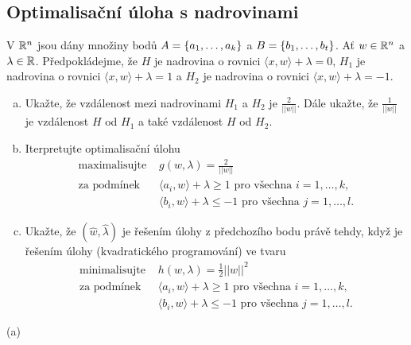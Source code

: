 \subsection{Optimalisační úloha s nadrovinami}
V $\mathbb{R}^n$ jsou dány množiny bodů $A = \left\lbrace a_1, \dots, a_k \right\rbrace$ a $B = \left\lbrace b_1, \dots, b_t \right\rbrace$. Ať $w \in \mathbb{R}^n$ a $\lambda \in \mathbb{R}$.
Předpokládejme, že $H$ je nadrovina o rovnici $\langle x,w \rangle + \lambda = 0$, $H_1$ je nadrovina o rovnici
$\langle x, w \rangle + \lambda = 1$ a $H_2$ je nadrovina o rovnici $\langle x, w \rangle + \lambda = -1$.
\begin{enumerate}[(a)]
    \item Ukažte, že vzdálenost mezi nadrovinami $H_1$ a $H_2$ je $\frac{2}{||w||}$. Dále ukažte, že $\frac{1}{||w||}$
    je vzdálenost $H$ od $H_1$ a také vzdálenost $H$ od $H_2$.
    \item Iterpretujte optimalisační úlohu
    \begin{align*}
        \text{maximalisujte } & g(w, \lambda) = \frac{2}{||w||} \\
        \text{za podmínek }   & \langle a_i, w \rangle + \lambda \geq 1 \text{ pro všechna } i=1, \dots, k, \\
                              & \langle b_i, w \rangle + \lambda \leq -1 \text{ pro všechna } j=1, \dots, l.
    \end{align*}
    \item Ukažte, že $(\hat w,\hat \lambda)$ je řešením úlohy z předchozího bodu právě tehdy, když je řešením úlohy
    (kvadratického programování) ve tvaru
    \begin{align*}
        \text{minimalisujte } & h(w, \lambda) = \frac{1}{2} ||w||^2 \\
        \text{za podmínek }   & \langle a_i, w \rangle + \lambda \geq 1 \text{ pro všechna } i=1, \dots, k, \\
                              & \langle b_i, w \rangle + \lambda \leq -1 \text{ pro všechna } j=1, \dots, l.
    \end{align*}
\end{enumerate}

(a) 

